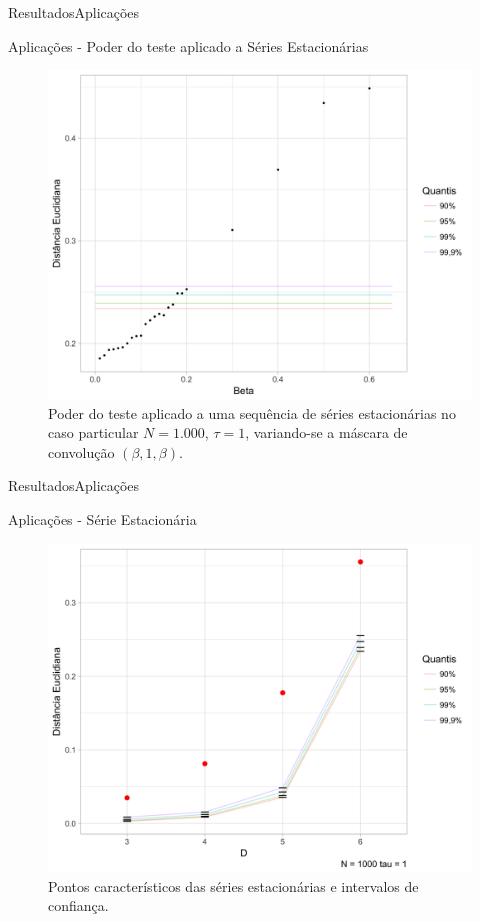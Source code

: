 \documentclass[10pt,xcolor={dvipsnames}]{beamer}
\begin{document}
\begin{frame}{Resultados}{Aplicações}
	\begin{block}{Aplicações - Poder do teste aplicado a Séries Estacionárias}
	\begin{figure}
		\centering
		\includegraphics[width=.65\linewidth]{beta_1k_D6_t1}
		\caption{Poder do teste aplicado a uma sequência de séries estacionárias no caso particular $N=1.000$, $\tau=1$, variando-se a máscara de convolução $(\beta,1,\beta)$.}\label{Fig:beta}
	\end{figure}	
	\end{block}
\end{frame}

\begin{frame}{Resultados}{Aplicações}
	\begin{block}{Aplicações - Série Estacionária}
	\begin{figure}
		\centering
		\includegraphics[width=.65\linewidth]{ConfidInt_estacionaria_1k_t1}
		\caption{Pontos característicos das séries estacionárias e intervalos de confiança.}\label{Fig:ConfidInt_estacionaria_1k_t1}
	\end{figure}	
	\end{block}
\end{frame}
\end{document}
